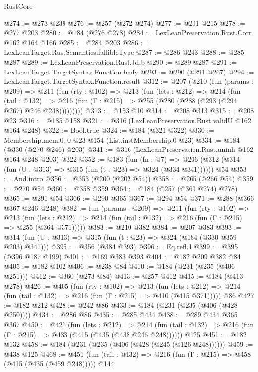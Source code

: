 \begin{lexlean}{RustCore}
\begin{coremodule}
@274 := @273 @239
@276 := @257 (@272 @274)
@277 := @201 @215
@278 := @277 @203
@280 := @184 (@276 @278)
@284 := LexLeanPreservation.Rust.Corr @162 @164 @166
@285 := @284 @203
@286 := LexLeanTarget.RustSemantics.fallibleType
@287 := @286 @243
@288 := @285 @287
@289 := LexLeanPreservation.Rust.Jd.b
@290 := @289 @287
@291 := LexLeanTarget.TargetSyntax.Function.body
@293 := @290 (@291 @267)
@294 := LexLeanTarget.TargetSyntax.Function.result
@312 := @207
    (@210
      (fun (params : @209) =>
      @211
        (fun (rty : @102) =>
        @213
          (fun (lets : @212) =>
          @214
            (fun (tail : @132) =>
            @216 (fun (Γ : @215) => @255 (@280 (@288 (@293 (@294 @267) @246 @248)))))))))
@313 := @153 @10
@314 := @208 @313
@315 := @208 @23
@316 := @185 @158
@321 := @316 (LexLeanPreservation.Rust.validU @162 @164 @248)
@322 := Bool.true
@324 := @184 (@321 @322)
@330 := Membership.mem.{0, 0} @23 @154 (List.instMembership.{0} @23)
@334 := @184 (@330 (@270 @246) @203)
@341 := @316 (LexLeanPreservation.Rust.uninh @162 @164 @248 @203) @322
@352 := @183
    (fun (fn : @7) =>
    @206 (@312 (@314 (fun (U : @313) => @315 (fun (t : @23) => @324 (@334 @341))))))
    @54
@353 := And.intro
@356 := @353 (@200 (@202 @54))
@358 := @265 (@266 @54)
@359 := @270 @54
@360 := @358 @359
@364 := @184 (@257 (@360 @274) @278)
@365 := @291 @54
@366 := @290 @365
@367 := @294 @54
@371 := @288 (@366 @367 @246 @248)
@382 := fun (params : @209) =>
  @211
    (fun (rty : @102) =>
    @213
      (fun (lets : @212) => @214 (fun (tail : @132) => @216 (fun (Γ : @215) => @255 (@364 @371)))))
@383 := @210 @382
@384 := @207 @383
@393 := @314 (fun (U : @313) => @315 (fun (t : @23) => @324 (@184 (@330 @359 @203) @341)))
@395 := @356 (@384 @393)
@396 := Eq.refl.{1}
@399 := @395 (@396 @187 @199)
@401 := @169 @383 @393
@404 := @182 @209 @382 @84
@405 := @182 @102
@406 := @238 @84
@410 := @184 (@231 (@235 (@406 @251)))
@412 := @360 (@273 @84)
@413 := @257 @412
@415 := @184 (@413 @278)
@426 := @405
    (fun (rty : @102) =>
    @213
      (fun (lets : @212) => @214 (fun (tail : @132) => @216 (fun (Γ : @215) => @410 (@415 @371)))))
    @86
@427 := @182 @212
@428 := @242 @86
@433 := @184 (@231 (@235 (@406 (@428 @250))))
@434 := @286 @86
@435 := @285 @434
@438 := @289 @434 @365 @367
@450 := @427
    (fun (lets : @212) =>
    @214 (fun (tail : @132) => @216 (fun (Γ : @215) => @433 (@415 (@435 (@438 @246 @248))))))
    @125
@451 := @182 @132
@458 := @184 (@231 (@235 (@406 (@428 (@245 (@126 @248))))))
@459 := @438 @125
@468 := @451 (fun (tail : @132) => @216 (fun (Γ : @215) => @458 (@415 (@435 (@459 @248))))) @144

\end{coremodule}
\end{lexlean}
